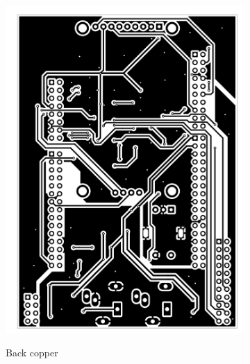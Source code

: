 \documentclass[a4paper,twoside,12pt]{book}
\begin{document}
\begin{figure}[H]
\begin{subfigure}[h]{0.3\textwidth}
        \includegraphics[width=\textwidth]{images/Board_back}
        \label{fig:board2}
        \caption{Back copper}
    \end{subfigure}
    ~
    \begin{subfigure}[h]{0.3\textwidth}

\end{subfigure}
\end{figure}
\end{document}
